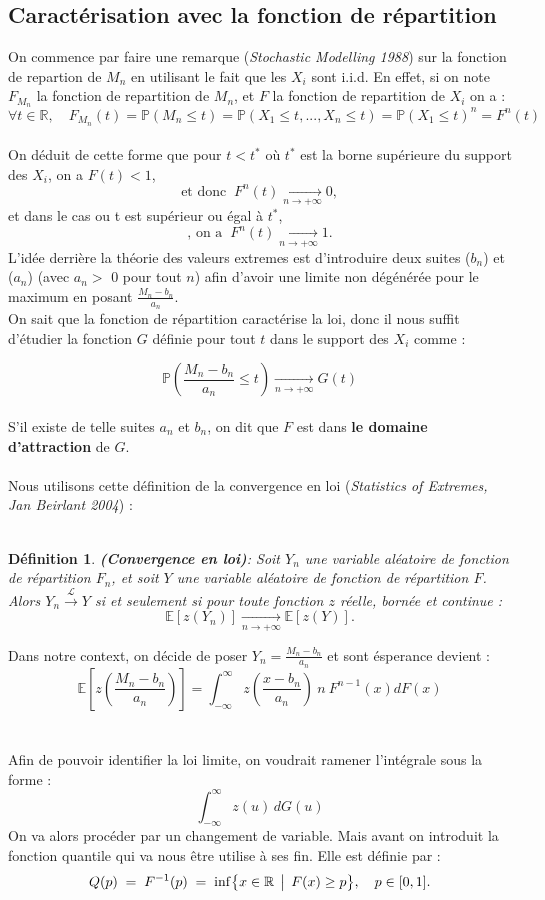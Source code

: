 \documentclass{article}
\theoremstyle{plain}
\newtheorem{definition}{Définition}[section]
\theoremstyle{definition}
\theoremstyle{plain}
\begin{document}
\subsection{Caractérisation avec la fonction de répartition}

\noindent On commence par faire une remarque (\textit{Stochastic Modelling 1988}) sur la fonction de repartion de $M_n$ en utilisant le fait que les $X_i$ sont i.i.d.
En effet, si on note $F_{M_n}$ la fonction de repartition de $M_n$, et $F$ la fonction de repartition de $X_i$ on a :
\[
\forall t \in \mathbb{R} , \quad F_{M_n}(t) = \mathbb{P}(M_n \le t) = \mathbb{P}(X_1 \le t,...,X_n \le t)=\mathbb{P}(X_1 \le t)^n = F^n(t) 
\]
\\
On déduit de cette forme que pour $t<t^*$ où $t^*$ est la borne supérieure du support des $X_i$, on a $F(t)<1$, 
\[
\text{et donc} \; \; F^n(t) \xrightarrow[n\to +\infty]{} 0,
\]
et dans le cas ou t est supérieur ou égal à $t^*$,
\[
\text{, on a} \; \; F^n(t) \xrightarrow[n\to +\infty]{} 1.
\]
L'idée derrière la théorie des valeurs extremes est d'introduire deux suites ($b_n$) et ($a_n$) (avec $a_n > $  0 pour tout $n$) afin d'avoir une limite non dégénérée pour le maximum en posant $\frac{M_n - b_n}{a_n}$. 
\\
On sait que la fonction de répartition caractérise la loi, donc il nous suffit d'étudier la fonction $G$ définie pour tout $t$ dans le support des $X_i$ comme :

\[
\mathbb{P} \left( \frac{M_n - b_n}{a_n} \le t \right) \xrightarrow[n\to +\infty]{} G(t)
\]
\\
S'il existe de telle suites $a_n$ et $b_n$, on dit que $F$ est dans \textbf{le domaine d'attraction} de $G$.
\\
\\
Nous utilisons cette définition de la convergence en loi (\textit{Statistics of Extremes, Jan Beirlant 2004}) :
\\
\\
\begin{definition}
\textbf{(Convergence en loi)}:
Soit \( Y_n \) une variable aléatoire de fonction de répartition \( F_n \), et soit \( Y \) une variable aléatoire de fonction de répartition \( F \).  
Alors $Y_n \xrightarrow{\mathcal{L} } Y$ si et seulement si pour toute fonction $z$ réelle, bornée et continue :
\[
\mathbb{E}[z(Y_n)] \xrightarrow[n\to +\infty]{} \mathbb{E}[z(Y)].
\]
\end{definition}
\noindent Dans notre context, on décide de poser $Y_n = \frac{M_n -b_n}{a_n}$ et sont ésperance devient : 
\[
\mathbb{E} \left[ z \left( \frac{M_n -b_n}{a_n} \right) \right] = \int_{-\infty}^{\infty} z \left( \frac{x-b_n}{a_n} \right) \: n \:  F^{n-1} (x)dF(x)
\]
\\
\\
Afin de pouvoir identifier la loi limite, on voudrait ramener l'intégrale sous la forme :
\[
\int_{-\infty}^{\infty} z(u) \, dG(u)
\]
On va alors procéder par un changement de variable. Mais avant on introduit la fonction quantile qui va nous être utilise à ses fin. Elle est définie par :
\\
\[
Q(p) \;=\; F^{-1}(p)
\;=\;
\inf\bigl\{x\in\mathbb{R}\,\bigm|\,F(x)\ge p\bigr\},
\quad p\in[0,1].
\]
\end{document}
